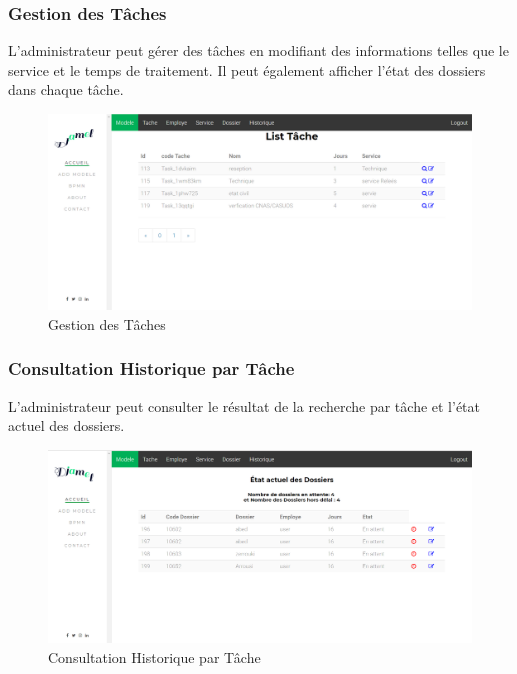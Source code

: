  
 
 
 \subsubsection{Gestion des Tâches }
L'administrateur peut gérer des tâches en modifiant des informations telles que le service et le temps de traitement. Il peut également afficher l'état des dossiers dans chaque tâche. 
\begin{figure}[H]
	\centering
	\includegraphics[width=1\linewidth]{images/captures/capturesadmin/tache}
	\caption{Gestion des Tâches}
	\label{fig:tache}
\end{figure}

\subsubsection{ Consultation Historique par Tâche }
L'administrateur peut consulter le résultat de la recherche par tâche et l'état actuel des dossiers. 
\begin{figure}[H]
	\centering
	\includegraphics[width=1\linewidth]{images/captures/capturesadmin/HTache}
	\caption{Consultation Historique par Tâche}
	\label{fig:htache}
\end{figure}


